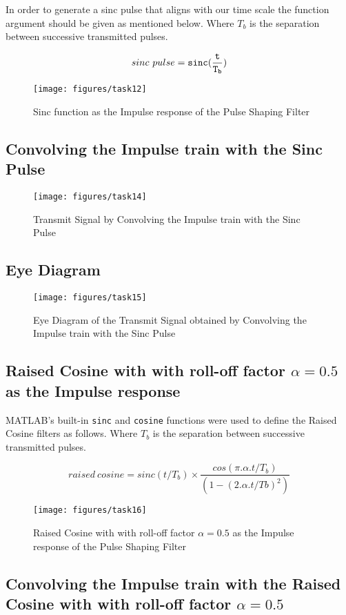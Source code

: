 \documentclass[a4paper,11pt]{article}%
\begin{document}
In order to generate  a sinc pulse that aligns with our time scale the function argument should be given as mentioned below. Where $T_b$ is the separation between
successive transmitted pulses.

\[
sinc~pulse = {\tt sinc(\frac{t}{T_b})}
\]
\begin{figure}[H]
	\centering
	\texttt{[image: figures/task12]}
	\caption{Sinc function as the Impulse response of the Pulse Shaping Filter}
\end{figure}

\subsection{Convolving the Impulse train with the Sinc Pulse}

\begin{figure}[H]
	\centering
	\texttt{[image: figures/task14]}
	\caption{Transmit Signal by Convolving the Impulse train with the Sinc Pulse}
\end{figure}

\subsection{Eye Diagram}

\begin{figure}[H]
	\centering
	\texttt{[image: figures/task15]}
	\caption{Eye Diagram of the Transmit Signal obtained by Convolving the Impulse train with the Sinc Pulse}
\end{figure}

\subsection{Raised Cosine with with roll-off factor $\alpha = 0.5$ as the Impulse response}
MATLAB's built-in {\tt sinc} and {\tt cosine} functions were used to define the Raised Cosine filters as follows. Where $T_b$ is the separation between successive transmitted pulses.

\[
raised~cosine = sinc(t/T_b)\times \frac{cos(\pi.\alpha.t/T_b)}{ (1 - (2.\alpha.t/Tb)^2 )}
\]

\begin{figure}[H]
	\centering
	\texttt{[image: figures/task16]}
	\caption{Raised Cosine with with roll-off factor $\alpha = 0.5$ as the Impulse response of the Pulse Shaping Filter}
\end{figure}

\subsection{Convolving the Impulse train with the Raised Cosine with with roll-off factor $\alpha = 0.5$}
\end{document}

